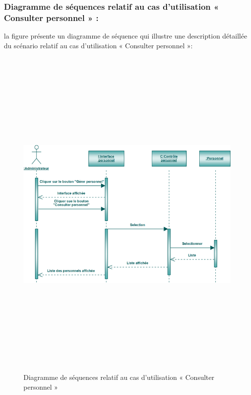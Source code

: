 \documentclass[12 pt]{report}
\begin{document}
\subsubsection{Diagramme de séquences relatif au cas d’utilisation « Consulter personnel » :}
la figure   présente un diagramme de séquence qui illustre une description détaillée du scénario relatif au cas d’utilisation « Consulter personnel »: 
{\begin{figure}[h]
 \begin{center}
\includegraphics[width= 18 cm ,height=  17cm]{sec_cons_per.PNG}
\caption{Diagramme de séquences relatif au cas d’utilisation « Consulter personnel  »}

\end{center}
\end{figure}}
\newpage
\end{document}
